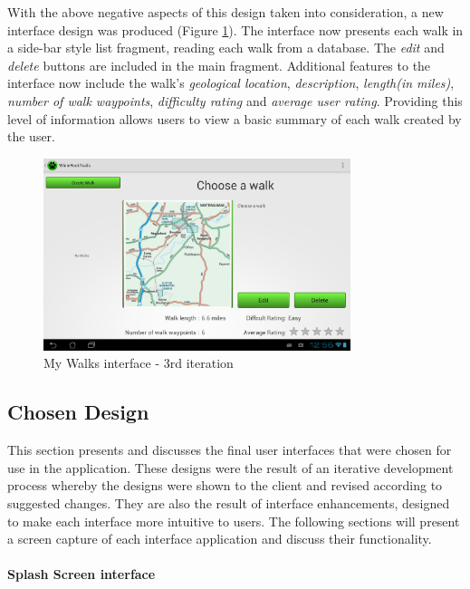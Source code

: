 \documentclass[11pt,a4paper]{report}
\begin{document}
With the above negative aspects of this design taken into consideration, a new interface design was produced (Figure \ref{fig:app_my walks_view2}). The interface now presents each walk in a side-bar style list fragment, reading each walk from a database. The \emph{edit} and \emph{delete} buttons are included in the main fragment. Additional features to the interface now include the walk's \emph{geological location}, \emph{description}, \emph{length(in miles)}, \emph{number of walk waypoints}, \emph{difficulty rating} and \emph{average user rating}. Providing this level of information allows users to view a basic summary of each walk created by the user.

\begin{figure}[H]
    \centering
    \includegraphics[width=0.8\textwidth]{chris/final_walk_view}
    \caption{My Walks interface - 3rd iteration}
    \label{fig:app_my walks_view2}
\end{figure}

\subsection{Chosen Design}
\label{sec:chosen-designs}

This section presents and discusses the final user interfaces that were chosen for use in the application. These designs were the result of an iterative development process whereby the designs were shown to the client and revised according to suggested changes. They are also the result of interface enhancements, designed to make each interface more intuitive to users. The following sections will present a screen capture of each interface application and discuss their functionality.

\paragraph*{Splash Screen interface}\mbox{}\\ 
\end{document}

